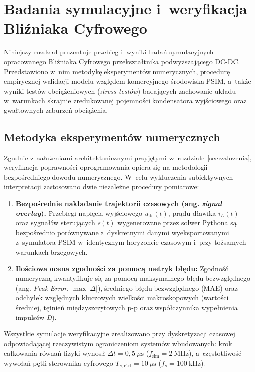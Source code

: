 \chapter{Badania symulacyjne i~weryfikacja Bliźniaka Cyfrowego}
\label{ch:badania}

Niniejszy rozdział prezentuje przebieg i~wyniki badań symulacyjnych opracowanego Bliźniaka Cyfrowego przekształtnika podwyższającego DC-DC. Przedstawiono w~nim metodykę eksperymentów numerycznych, procedurę empirycznej walidacji modelu względem komercyjnego środowiska PSIM, a~także wyniki testów obciążeniowych (\emph{stress-testów}) badających zachowanie układu w~warunkach skrajnie zredukowanej pojemności kondensatora wyjściowego oraz gwałtownych zaburzeń obciążenia.

\section{Metodyka eksperymentów numerycznych}
\label{sec:metodyka}

Zgodnie z~założeniami architektonicznymi przyjętymi w~rozdziale~\ref{sec:zalozenia}, weryfikacja poprawności oprogramowania opiera się na metodologii bezpośredniego dowodu numerycznego. W~celu wykluczenia subiektywnych interpretacji zastosowano dwie niezależne procedury pomiarowe:
\begin{enumerate}
    \item \textbf{Bezpośrednie nakładanie trajektorii czasowych (ang. \emph{signal overlay}):} Przebiegi napięcia wyjściowego $u_{\mathrm{dc}}(t)$, prądu dławika $i_L(t)$ oraz sygnałów sterujących $s(t)$ wygenerowane przez solwer Pythona są bezpośrednio porównywane z~dyskretnymi danymi wyeksportowanymi z~symulatora PSIM w~identycznym horyzoncie czasowym i~przy tożsamych warunkach brzegowych.
    \item \textbf{Ilościowa ocena zgodności za pomocą metryk błędu:} Zgodność numeryczną kwantyfikuje się za pomocą maksymalnego błędu bezwzględnego (ang. \emph{Peak Error}, $\max|\Delta|$), średniego błędu bezwzględnego (MAE) oraz odchyłek względnych kluczowych wielkości makroskopowych (wartości średniej, tętnień międzyszczytowych p-p oraz współczynnika wypełnienia impulsów $D$).
\end{enumerate}

Wszystkie symulacje weryfikacyjne zrealizowano przy dyskretyzacji czasowej odpowiadającej rzeczywistym ograniczeniom systemów wbudowanych: krok całkowania równań fizyki wynosił $\Delta t = 0{,}5~\mu\mathrm{s}$ ($f_{\mathrm{sim}} = 2~\mathrm{MHz}$), a~częstotliwość wywołań pętli sterownika cyfrowego $T_{s,\mathrm{ctrl}} = 10~\mu\mathrm{s}$ ($f_s = 100~\mathrm{kHz}$).


